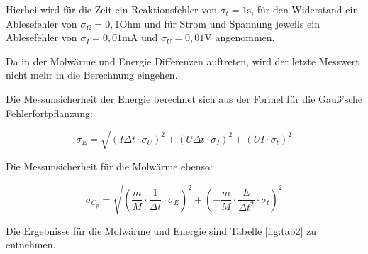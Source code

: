 \noindent Hierbei wird für die Zeit ein Reaktionsfehler von \(\sigma_t=1\text{s}\), für den Widerstand ein Ablesefehler von \(\sigma_\Omega=0,1\text{Ohm}\) und für Strom und Spannung jeweils ein Ablesefehler von \(\sigma_I=0,01\text{mA}\) und \(\sigma_U=0,01\text{V}\) angenommen.

\noindent Da in der Molwärme und Energie Differenzen auftreten, wird der letzte Messwert nicht mehr in die Berechnung eingehen.

\noindent Die Messunsicherheit der Energie berechnet sich aus der Formel für die Gauß'sche Fehlerfortpflanzung:

\begin{equation}
\sigma_E=\sqrt{(I\Delta t\cdot\sigma_U)^2 + (U\Delta t\cdot\sigma_I)^2 + (UI\cdot\sigma_t)^2}
\end{equation}

\noindent Die Messunsicherheit für die Molwärme ebenso:

\begin{equation}
\sigma_{C_p}=\sqrt{\left(\frac mM\cdot\frac{1}{\Delta t}\cdot\sigma_E\right)^2+\left(-\frac mM\cdot\frac{E}{\Delta t^2}\cdot\sigma_t\right)^2 }
\end{equation}

\noindent Die Ergebnisse für die Molwärme und Energie sind Tabelle \ref{fig:tab2} zu entnehmen.

